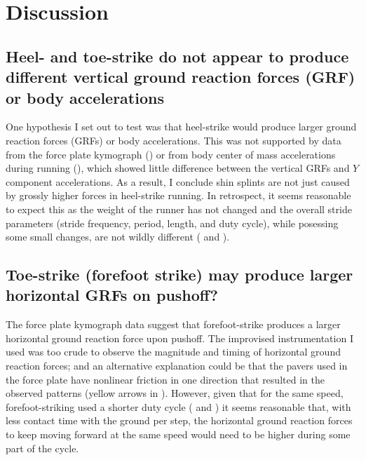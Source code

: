 \section{Discussion}
\label{sec:discussion}

\subsection{Heel- and toe-strike do not appear to produce different vertical ground reaction forces (GRF) or body accelerations}

One hypothesis I set out to test was that heel-strike would produce larger ground reaction forces (GRFs) or body accelerations. This was not supported by data from the force plate kymograph () or from body center of mass accelerations during running (), which showed little difference between the vertical GRFs and $Y$ component accelerations. As a result, I conclude shin splints are not just caused by grossly higher forces in heel-strike running. In retrospect, it seems reasonable to expect this as the weight of the runner has not changed and the overall stride parameters (stride frequency, period, length, and duty cycle), while posessing some small changes, are not wildly different ( and ). 



\subsection{Toe-strike (forefoot strike) may produce larger horizontal GRFs on pushoff?}

The force plate kymograph data suggest that forefoot-strike produces a larger horizontal ground reaction force upon pushoff. The improvised instrumentation I used was too crude to observe the magnitude and timing of horizontal ground reaction forces; and an alternative explanation could be that the pavers used in the force plate have nonlinear friction in one direction that resulted in the observed patterns (yellow arrows in ). However, given that for the same speed, forefoot-striking used a shorter duty cycle ( and ) it seems reasonable that, with less contact time with the ground per step, the horizontal ground reaction forces to keep moving forward at the same speed would need to be higher during some part of the cycle.



